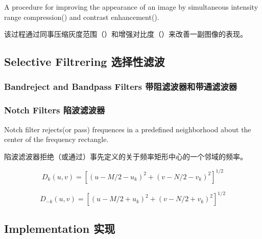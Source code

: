 \documentclass[12pt]{article}
\numberwithin{equation}{section}%
\begin{document}
A procedure for improving the appearance of an image by simultaneous intensity range compression({\color{blue}{$\ln$}}) and contrast enhancement({\color{blue}{filter}}).

该过程通过同事压缩灰度范围（{\color{blue}{$\ln$}}）和增强对比度（{\color{blue}{filter}}）来改善一副图像的表现。

\subsection{Selective Filtrering 选择性滤波}

\subsubsection{Bandreject and Bandpass Filters 带阻滤波器和带通滤波器}

\subsubsection{Notch Filters 陷波滤波器}

Notch filter rejects(or pass) frequences in a predefined neighborhood about the center of the frequency rectangle.

陷波滤波器拒绝（或通过）事先定义的关于频率矩形中心的一个邻域的频率。

\begin{equation} \label{4.61}
D_{k}(u,v)=[(u-M/2-u_{k})^{2}+(v-N/2-v_{k})^{2}]^{1/2}
\end{equation}

\begin{equation} \label{4.62}
D_{-k}(u,v)=[(u-M/2+u_{k})^{2}+(v-N/2+v_{k})^{2}]^{1/2}
\end{equation}

\subsection{Implementation 实现}




 





\end{document}
